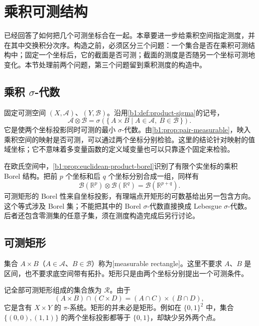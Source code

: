 \section{乘积可测结构}
\label{b1:sec:0701}

已经回答了如何把几个可测坐标合在一起。本章要进一步给乘积空间指定测度，并在其中交换积分次序。构造之前，必须区分三个问题：一个集合是否在乘积可测结构中；固定一个坐标后，它的截面是否可测；截面的测度是否随另一个坐标可测地变化。本节处理前两个问题，第三个问题留到乘积测度的构造中。

\subsection{乘积 \texorpdfstring{\(\sigma\)}{\AnalysisPdfSigma}-代数}
\label{b1:subsec:070101}

固定可测空间 \((X,\mathcal A)\)、\((Y,\mathcal B)\)。沿用\cref{b1:def:product-sigma}的记号，
\[
\mathcal A\otimes\mathcal B
=\sigma\left(\{\,A\times B\mid A\in\mathcal A,\ B\in\mathcal B\,\}\right).
\]
它是使两个坐标投影同时可测的最小 \(\sigma\)-代数。由\cref{b1:prop:pair-measurable}，映入乘积空间的映射是否可测，可以通过两个坐标分别检验。这里的结论针对映射的值域坐标；它不意味着多变量函数的定义域变量也可以只靠逐个固定来检验。

\ProseParagraphBreak

在欧氏空间中，\cref{b1:prop:euclidean-product-borel}识别了有限个实坐标的乘积 Borel 结构。把前 \(p\) 个坐标和后 \(q\) 个坐标分别合成一组，同样有
\[
\mathcal B(\mathbb R^p)\otimes\mathcal B(\mathbb R^q)
=\mathcal B(\mathbb R^{p+q}).
\]
可测矩形的 Borel 性来自坐标投影，有理端点开矩形的可数基给出另一包含方向。这个等式涉及 Borel 集；不能把其中的 Borel \(\sigma\)-代数直接换成 Lebesgue \(\sigma\)-代数。后者还包含零测集的任意子集，须在测度构造完成后另行讨论。

\subsection{可测矩形}
\label{b1:subsec:070102}

集合 \(A\times B\)（\(A\in\mathcal A\)、\(B\in\mathcal B\)）称为[measurable rectangle]。这里不要求 \(A\)、\(B\) 是区间，也不要求底空间带有拓扑。矩形只是由两个坐标分别提出一个可测条件。

\ProseParagraphBreak

记全部可测矩形组成的集合族为 \(\mathcal R\)。由于
\[
(A\times B)\cap(C\times D)=(A\cap C)\times(B\cap D),
\]
它是含有 \(X\times Y\) 的 \(\pi\)-系统。矩形的并未必是矩形。例如在 \(\{0,1\}^2\) 中，集合 \(\{(0,0),(1,1)\}\) 的两个坐标投影都等于 \(\{0,1\}\)，却缺少另外两个点。

